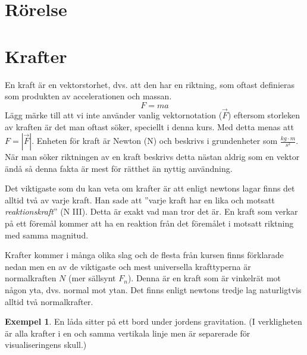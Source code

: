 \documentclass[12pt, a4paper]{article}
\theoremstyle{definition}
\newtheorem{exm}{Exempel}
\begin{document}
    \part{Rörelse}
    

    \part{Krafter}
    En kraft är en vektorstorhet, dvs. att den har en riktning, som oftast definieras som produkten av accelerationen och massan.
    \begin{equation*}
        F=ma
    \end{equation*}
    Lägg märke till att vi inte använder vanlig vektornotation ($\vec{F}$) eftersom storleken av kraften är det man oftast söker, speciellt i denna kurs. Med detta menas att $F = |\vec{F}|$. Enheten för kraft är Newton (N) och beskrivs i grundenheter som $\frac{kg \cdot m}{s^2}$. När man söker riktningen av en kraft beskrivs detta nästan aldrig som en vektor ändå så denna fakta är mest för rätthet än nyttig användning.

    Det viktigaste som du kan veta om krafter är att enligt newtons lagar finns det alltid två av varje kraft. Han sade att ''varje kraft har en lika och motsatt \emph{reaktionskraft}'' (N III). Detta är exakt vad man tror det är. En kraft som verkar på ett föremål kommer att ha en reaktion från det föremålet i motsatt riktning med samma magnitud.

    Krafter kommer i många olika slag och de flesta från kursen finns förklarade nedan men en av de viktigaste och mest universella krafttyperna är normalkraften $N$ (mer sällsynt $F_n$). Denna är en kraft som är vinkelrät mot någon yta, dvs. normal mot ytan. Det finns enligt newtons tredje lag naturligtvis alltid två normalkrafter.
    \begin{exm}
        En låda sitter på ett bord under jordens gravitation. (I verkligheten är alla krafter i en och samma vertikala linje men är separerade för visualiseringens skull.)
        \begin{center}
        \end{center}
    \end{exm}
\end{document}
